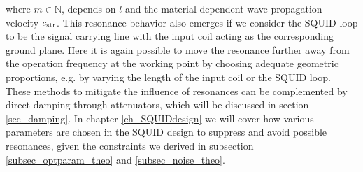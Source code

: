
where $m\in\mathbb{N}$, depends on $l$ and the material-dependent wave propagation velocity $c_{\rm str}$. This resonance behavior also emerges if we consider the SQUID loop to be the signal carrying line with the input coil acting as the corresponding ground plane. Here it is again possible to move the resonance further away from the operation frequency at the working point by choosing adequate geometric proportions, e.g. by varying the length of the input coil or the SQUID loop. These methods to mitigate the influence of resonances can be complemented by direct damping through attenuators, which will be discussed in section \ref{sec_damping}. In chapter \ref{ch_SQUIDdesign} we will cover how various parameters are chosen in the SQUID design to suppress and avoid possible resonances, given the constraints we derived in subsection \ref{subsec_optparam_theo} and \ref{subsec_noise_theo}.